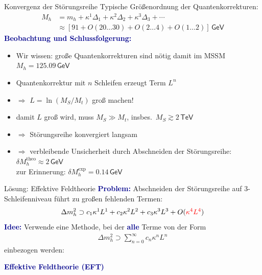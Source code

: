\documentclass[hyperref={pdfpagelabels=false},ngerman]{beamer}
\newcommand{\eh}[1]{\,\mathsf{#1}}
\newcommand{\MS}{\ensuremath{M_S}}
\newcommand{\mycite}[1]{\ensuremath{\text{\textcolor{darkgray}{\tiny [#1]}}}}
\renewcommand{\emph}[1]{\textbf{\textcolor{darkblue}{#1}}}
\newcommand{\GeV}{\eh{GeV}}
\newcommand{\TeV}{\eh{TeV}}
\begin{document}
\begin{frame}{Konvergenz der Störungsreihe}
  Typische Größenordnung der Quantenkorrekturen:
  \begin{align*}
    M_h &= m_h + \kappa^1\Delta_1 + \kappa^2\Delta_2 + \kappa^3\Delta_3 + \cdots \\
    &\approx [91 + O(20\ldots 30) + O(2\ldots 4) + O(1\ldots 2)] \GeV
  \end{align*}
  \emph{Beobachtung und Schlussfolgerung:}
  \begin{itemize}
  \item Wir wissen: große Quantenkorrekturen sind nötig damit im MSSM $M_h = 125.09\GeV$
  \item Quantenkorrektur mit $n$ Schleifen erzeugt Term $L^n$
  \item $\Rightarrow$ $L=\ln(\MS / M_t)$ groß machen!
  \item damit $L$ groß wird, muss $\MS \gg M_t$, insbes.\
    $\MS \gtrsim 2\TeV$
  \item $\Rightarrow$ Störungsreihe konvergiert langsam
  \item $\Rightarrow$ verbleibende Unsicherheit durch Abschneiden der
    Störungsreihe: $\delta M_h^{\text{theo}} \approx 2\GeV$ \\
    zur Erinnerung: $\delta M_h^{\text{exp}} = 0.14\GeV$
  \end{itemize}
\end{frame}

\begin{frame}{Unsicherheitsabschätzung}
  \begin{center}
    \texttt{[image: \{\{plots/SOFTSUSY/SS\_TB-20\_Xt--sqrt6]}}}
  \end{center}
  \raggedleft\mycite{1804.09410}
\end{frame}

\begin{frame}{Lösung: Effektive Feldtheorie}
  \emph{Problem:} Abschneiden der Störungsreihe auf 3-Schleifenniveau
  führt zu großen fehlenden Termen:
  \begin{align*}
    \Delta m_h^2\supset c_1 \kappa^1 L^1 + c_2 \kappa^2 L^2 + c_3 \kappa^3 L^3
    + O(\textcolor{red}{\kappa^4 L^4})
  \end{align*}
  \emph{Idee:} Verwende eine Methode, bei der \emph{alle} Terme von der Form
  \begin{align*}
    \Delta m_h^2 \supset \sum_{n=0}^\infty c_n \kappa^n L^n
  \end{align*}
  einbezogen werden:
  \begin{center}
    \emph{Effektive Feldtheorie (EFT)}
  \end{center}
\end{frame}
\end{document}
